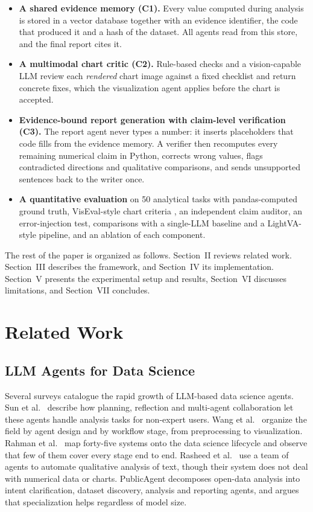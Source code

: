 \documentclass[conference]{IEEEtran}
\begin{document}
\begin{itemize}
\item \textbf{A shared evidence memory (C1).} Every value computed during analysis is stored in a vector database together with an evidence identifier, the code that produced it and a hash of the dataset. All agents read from this store, and the final report cites it.
\item \textbf{A multimodal chart critic (C2).} Rule-based checks and a vision-capable LLM review each \emph{rendered} chart image against a fixed checklist and return concrete fixes, which the visualization agent applies before the chart is accepted.
\item \textbf{Evidence-bound report generation with claim-level verification (C3).} The report agent never types a number: it inserts placeholders that code fills from the evidence memory. A verifier then recomputes every remaining numerical claim in Python, corrects wrong values, flags contradicted directions and qualitative comparisons, and sends unsupported sentences back to the writer once.
\item \textbf{A quantitative evaluation} on 50 analytical tasks with pandas-computed ground truth, VisEval-style chart criteria \cite{chen2025viseval}, an independent claim auditor, an error-injection test, comparisons with a single-LLM baseline and a LightVA-style pipeline, and an ablation of each component.
\end{itemize}

The rest of the paper is organized as follows. Section~II reviews related work. Section~III describes the framework, and Section~IV its implementation. Section~V presents the experimental setup and results, Section~VI discusses limitations, and Section~VII concludes.

\section{Related Work}

\subsection{LLM Agents for Data Science}
Several surveys catalogue the rapid growth of LLM-based data science agents. Sun et al.\ \cite{sun2025survey} describe how planning, reflection and multi-agent collaboration let these agents handle analysis tasks for non-expert users. Wang et al.\ \cite{wang2025dssurvey} organize the field by agent design and by workflow stage, from preprocessing to visualization. Rahman et al.\ \cite{rahman2025dssurvey} map forty-five systems onto the data science lifecycle and observe that few of them cover every stage end to end. Rasheed et al.\ \cite{rasheed2024qualitative} use a team of agents to automate qualitative analysis of text, though their system does not deal with numerical data or charts. PublicAgent \cite{montazeri2025publicagent} decomposes open-data analysis into intent clarification, dataset discovery, analysis and reporting agents, and argues that specialization helps regardless of model size.
\end{document}
